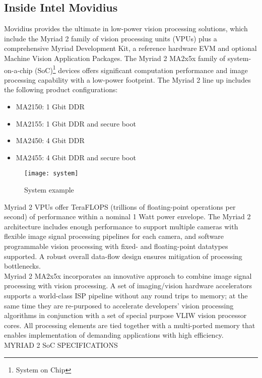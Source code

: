 \subsection{Inside Intel Movidius}
\label{subsec:techspec}
Movidius provides the ultimate in low-power vision processing solutions, which 
include the Myriad 2 family of vision processing units (VPUs) plus a 
comprehensive Myriad Development Kit, a reference hardware EVM and 
optional Machine Vision Application Packages.
The Myriad 2 MA2x5x family of system-on-a-chip (SoC)\footnote{System on Chip} 
devices offers significant computation performance and image processing 
capability with a low-power footprint.
The Myriad 2 line up includes the following product configurations:
\begin{itemize}
	\item	MA2150: 1 Gbit DDR
	\item	MA2155: 1 Gbit DDR and secure boot 
	\item	MA2450: 4 Gbit DDR
	\item	MA2455: 4 Gbit DDR and secure boot
\end{itemize}
%
\begin{figure}[!h]
\centering
\texttt{[image: system]}
\caption{System example}
\label{fig:systemexample}
\end{figure}
% 
Myriad 2 VPUs offer TeraFLOPS (trillions of floating-point operations per 
second) of performance within a nominal 1 Watt power envelope. 
The Myriad 2 architecture includes enough performance to support multiple cameras 
with flexible image signal processing pipelines for each camera, and software 
programmable vision processing with fixed- and floating-point datatypes supported. 
A robust overall data-flow design ensures mitigation of processing bottlenecks.\\
Myriad 2 MA2x5x incorporates an innovative approach to combine image signal 
processing with vision processing. 
A set of imaging/vision hardware accelerators supports a world-class ISP pipeline 
without any round trips to memory; at the same time they are re-purposed to 
accelerate developers' vision processing algorithms in conjunction with a set of 
special purpose VLIW vision processor cores. 
All processing elements are tied together with a multi-ported memory that enables 
implementation of demanding applications with high efficiency.\cite{intel}\\
MYRIAD 2 SoC SPECIFICATIONS
